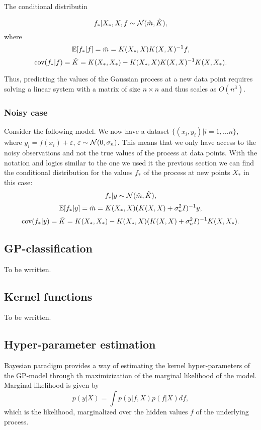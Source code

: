 \documentclass[12pt]{article}
\begin{document}
	The conditional distributin
	
	$$f_* | X_*, X, f \sim \mathcal{N}( \hat m, \hat K ),$$
	where 
	$$\mathbb{E} [f_* | f ] = \hat m = K(X_*, X) K(X, X)^{-1} f,$$
	$$\mbox{cov}(f_* | f ) = \hat K = K(X_*, X_*) - K(X_*, X)K(X, X)^{-1}K(X, X_*).$$
		
	Thus, predicting the values of the Gaussian process at a new data point requires solving a linear system with a matrix of size $n \times n$ and thus scales as $O(n^3)$.
	
	\subsubsection{Noisy case}
		\hspace{0.6cm}Consider the following model. We now have a dataset $\{(x_i, y_i)| i = 1, \ldots n\}$, where $y_i = f(x_i) + \varepsilon$, $\varepsilon \sim \mathcal{N}(0, \sigma_n)$. This means that we only have access to the noisy observations and not the true values of the process at data points. With the notation and logics similar to the one we used it the previous section we can find the conditional distribution for the values $f_*$ of the process at new points $X_*$ in this case:
		$$f_* | y \sim \mathcal{N}( \hat m, \hat K ),$$
		$$\mathbb{E}[f_* | y] = \hat m = K(X_*, X) (K(X, X) + \sigma_n^2 I)^{-1} y,$$
		$$\mbox{cov}(f_* | y ) = \hat K = K(X_*, X_*) - K(X_*, X)(K(X, X) + \sigma_n^2 I)^{-1}K(X, X_*).$$
		
\subsection{GP-classification}
	\hspace{0.6cm}To be wrritten.
	
\subsection{Kernel functions}
	\hspace{0.6cm}To be wrritten.
	
\subsection{Hyper-parameter estimation}
	\hspace{0.6cm}Bayesian paradigm provides a way of estimating the kernel hyper-parameters of the GP-model through th  maximizization of the marginal likelihood of the model. Marginal likelihood is given by
	$$p(y | X) = \int p(y | f, X) p(f | X) df,$$
	which is the likelihood, marginalized over the hidden values $f$ of the underlying process.
	
\end{document}
